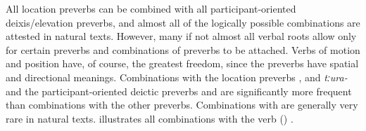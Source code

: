 All location preverbs can be combined with all participant-oriented deixis/elevation preverbs, and almost all of the logically possible combinations are attested in natural texts. However, many if not almost all verbal roots allow only for certain preverbs and combinations of preverbs to be attached. Verbs of motion and position have, of course, the greatest freedom, since the preverbs have spatial and directional meanings. Combinations with the location preverbs , and \textit{tːura-} and the participant-oriented deictic preverbs  and  are significantly more frequent than combinations with the other preverbs. Combinations with  are generally very rare in natural texts.  illustrates all combinations with the verb  () .
%

